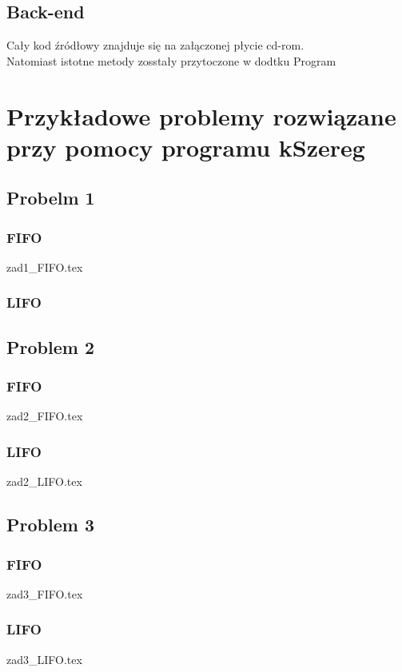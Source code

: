 \documentclass[twoside]{kInzynierka}
\begin{document}
\subsection     {Back-end}
  Cały kod źródłowy znajduje się na załączonej płycie cd-rom. \\
Natomiast istotne metody  zosstały przytoczone w dodtku Program \\     
\section        [Przykładowe problemy \ldots]
                {Przykładowe problemy \newlineTekst rozwiązane przy pomocy \newline programu kSzereg}
       
\subsection     {Probelm 1}
\subsubsection  {FIFO}
 {zad1_FIFO.tex}
\subsubsection  {LIFO}


\newpage
\subsection     {Problem 2}
\subsubsection  {FIFO}
 {zad2_FIFO.tex}
\subsubsection  {LIFO}
 {zad2_LIFO.tex}

\newpage
\subsection     {Problem 3}
\subsubsection  {FIFO}
 {zad3_FIFO.tex}
\subsubsection  {LIFO}
 {zad3_LIFO.tex}
\end{document}
